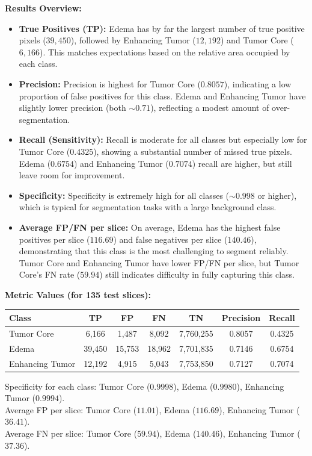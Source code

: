 \textbf{Results Overview:}
\begin{itemize}
    \item \textbf{True Positives (TP):} Edema has by far the largest number of true positive pixels ($39{,}450$), followed by Enhancing Tumor ($12{,}192$) and Tumor Core ($6{,}166$). This matches expectations based on the relative area occupied by each class.
    \item \textbf{Precision:} Precision is highest for Tumor Core ($0.8057$), indicating a low proportion of false positives for this class. Edema and Enhancing Tumor have slightly lower precision (both $\sim0.71$), reflecting a modest amount of over-segmentation.
    \item \textbf{Recall (Sensitivity):} Recall is moderate for all classes but especially low for Tumor Core ($0.4325$), showing a substantial number of missed true pixels. Edema ($0.6754$) and Enhancing Tumor ($0.7074$) recall are higher, but still leave room for improvement.
    \item \textbf{Specificity:} Specificity is extremely high for all classes ($\sim0.998$ or higher), which is typical for segmentation tasks with a large background class.
    \item \textbf{Average FP/FN per slice:} On average, Edema has the highest false positives per slice ($116.69$) and false negatives per slice ($140.46$), demonstrating that this class is the most challenging to segment reliably. Tumor Core and Enhancing Tumor have lower FP/FN per slice, but Tumor Core's FN rate ($59.94$) still indicates difficulty in fully capturing this class.
\end{itemize}

\textbf{Metric Values (for 135 test slices):}
\begin{center}
\begin{tabular}{lcccccc}
\toprule
\textbf{Class} & \textbf{TP} & \textbf{FP} & \textbf{FN} & \textbf{TN} & \textbf{Precision} & \textbf{Recall} \\
\midrule
Tumor Core       & 6,166  & 1,487  & 8,092  & 7,760,255 & 0.8057 & 0.4325 \\
Edema            & 39,450 & 15,753 & 18,962 & 7,701,835 & 0.7146 & 0.6754 \\
Enhancing Tumor  & 12,192 & 4,915  & 5,043  & 7,753,850 & 0.7127 & 0.7074 \\
\bottomrule
\end{tabular}
\end{center}
\noindent
Specificity for each class: Tumor Core ($0.9998$), Edema ($0.9980$), Enhancing Tumor ($0.9994$). \\
Average FP per slice: Tumor Core ($11.01$), Edema ($116.69$), Enhancing Tumor ($36.41$). \\
Average FN per slice: Tumor Core ($59.94$), Edema ($140.46$), Enhancing Tumor ($37.36$).





